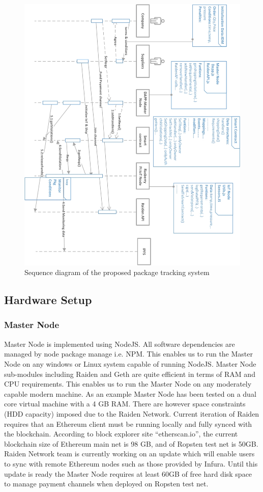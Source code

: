 \begin{figure}[h]
	\centering
    \includegraphics[width=180mm,scale=1]{figs/SD-Flip}
	\caption{Sequence diagram of the proposed package tracking system}
	\label{fig:SysSD} 
\end{figure}
\clearpage

\subsection{Hardware Setup}
\subsubsection{Master Node}
Master Node is implemented using NodeJS. All software dependencies are managed by node package manage i.e. NPM. This enables us to run the Master Node on any windows or Linux system capable of running NodeJS. Master Node sub-modules including Raiden and Geth are quite efficient in terms of RAM and CPU requirements. This enables us to run the Master Node on any moderately capable modern machine. As an example Master Node has been tested on a dual core virtual machine with a 4 GB RAM. There are however space constraints (HDD capacity) imposed due to the Raiden Network. Current iteration of Raiden requires that an Ethereum client must be running locally and fully synced with the blockchain. According to block explorer site “etherscan.io”, the current blockchain size of Ethereum main net is 98 GB, and of Ropsten test net is 50GB. Raiden Network team is currently working on an update which will enable users to sync with remote Ethereum nodes such as those provided by Infura. Until this update is ready the Master Node requires at least 60GB of free hard disk space to manage payment channels when deployed on Ropsten test net. 
\vspace{0.5cm}
